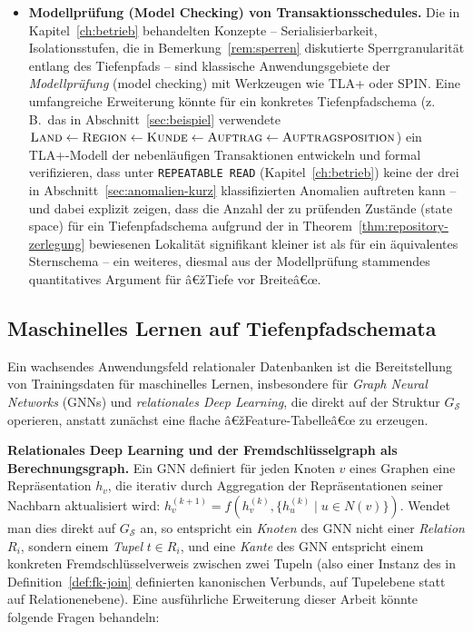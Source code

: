 ﻿\documentclass[a4paper,12pt]{report}
\theoremstyle{definition}
\theoremstyle{remark}
\begin{document}
\begin{itemize}
  \item \textbf{Modellprüfung (Model Checking) von
    Transaktionsschedules.} Die in Kapitel~\ref{ch:betrieb}
    behandelten Konzepte -- Serialisierbarkeit, Isolationsstufen,
    die in Bemerkung~\ref{rem:sperren} diskutierte
    Sperrgranularität entlang des Tiefenpfads -- sind klassische
    Anwendungsgebiete der \emph{Modellprüfung} (model checking) mit
    Werkzeugen wie TLA+ oder SPIN. Eine umfangreiche Erweiterung
    könnte für ein konkretes Tiefenpfadschema (z.\,B.\ das in
    Abschnitt~\ref{sec:beispiel} verwendete
    $\textsc{Land}\leftarrow\textsc{Region}\leftarrow\textsc{Kunde}
    \leftarrow\textsc{Auftrag}\leftarrow\textsc{Auftragsposition}$)
    ein TLA+-Modell der nebenläufigen Transaktionen entwickeln und
    formal verifizieren, dass unter \texttt{REPEATABLE READ}
    (Kapitel~\ref{ch:betrieb}) keine der drei in
    Abschnitt~\ref{sec:anomalien-kurz} klassifizierten Anomalien
    auftreten kann -- und dabei explizit zeigen, dass die Anzahl der
    zu prüfenden Zustände (state space) für ein Tiefenpfadschema
    aufgrund der in Theorem~\ref{thm:repository-zerlegung} bewiesenen
    Lokalität signifikant kleiner ist als für ein äquivalentes
    Sternschema -- ein weiteres, diesmal aus der Modellprüfung
    stammendes quantitatives Argument für â€žTiefe vor Breiteâ€œ.
\end{itemize}

\subsection{Maschinelles Lernen auf Tiefenpfadschemata}
\label{sec:ausblick-ml}

Ein wachsendes Anwendungsfeld relationaler Datenbanken ist die
Bereitstellung von Trainingsdaten für maschinelles Lernen,
insbesondere für \emph{Graph Neural Networks} (GNNs) und
\emph{relationales Deep Learning}, die direkt auf der Struktur
$G_{\mathcal{S}}$ operieren, anstatt zunächst eine flache
â€žFeature-Tabelleâ€œ zu erzeugen.

\textbf{Relationales Deep Learning und der Fremdschlüsselgraph als
Berechnungsgraph.} Ein GNN definiert für jeden Knoten $v$ eines
Graphen eine Repräsentation $h_v$, die iterativ durch Aggregation der
Repräsentationen seiner Nachbarn aktualisiert wird:
$h_v^{(k+1)} = f(h_v^{(k)}, \{h_u^{(k)} \mid u \in
N(v)\})$. Wendet man dies direkt auf $G_{\mathcal{S}}$ an, so
entspricht ein \emph{Knoten} des GNN nicht einer \emph{Relation}
$R_i$, sondern einem \emph{Tupel} $t\in R_i$, und eine
\emph{Kante} des GNN entspricht einem konkreten Fremdschlüsselverweis
zwischen zwei Tupeln (also einer Instanz des in
Definition~\ref{def:fk-join} definierten kanonischen Verbunds, auf
Tupelebene statt auf Relationenebene). Eine ausführliche Erweiterung
dieser Arbeit könnte folgende Fragen behandeln:
\end{document}
